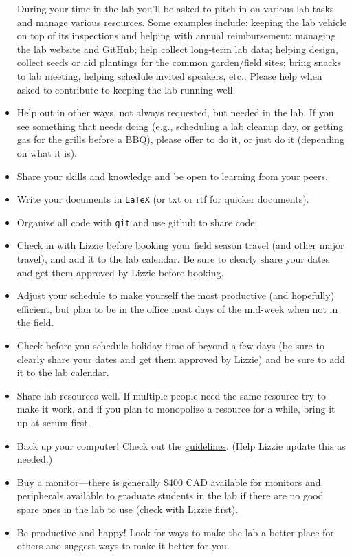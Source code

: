 \documentclass[11pt,a4paper,oneside]{article}
\begin{document}
\begin{itemize}
During your time in the lab you'll be asked to pitch in on various lab tasks and manage various resources. Some examples include: keeping the lab vehicle on top of its inspections and helping with annual reimbursement; managing the lab website and GitHub; help collect long-term lab data; helping design, collect seeds or aid plantings for the common garden/field sites; bring snacks to lab meeting, helping schedule invited speakers, etc.. Please help when asked to contribute to keeping the lab running well. 
\item Help out in other ways, not always requested, but needed in the lab. If you see something that needs doing (e.g., scheduling a lab cleanup day, or getting gas for the grills before a BBQ), please offer to do it, or just do it (depending on what it is). 
\item Share your skills and knowledge and be open to learning from your peers. 
\item Write your documents in \verb|LaTeX| (or txt or rtf for quicker documents).
\item Organize all code with \verb|git| and use github to share code.
\item Check in with Lizzie before booking your field season travel (and other major travel), and add it to the lab calendar. Be sure to clearly share your dates and get them approved by Lizzie before booking. 
\item Adjust your schedule to make yourself the most productive (and hopefully) efficient, but plan to be in the office most days of the mid-week when not in the field.
\item Check before you schedule holiday time of beyond a few days (be sure to clearly share your dates and get them approved by Lizzie) and be sure to add it to the lab calendar.
\item Share lab resources well. If multiple people need the same resource try to make it work, and if you plan to monopolize a resource for a while, bring it up at scrum first. 
\item Back up your computer! Check out the \href{https://github.com/temporalecologylab/labgit/blob/master/datacodemgmt/databackuplab.txt}{guidelines}. (Help Lizzie update this as needed.)
\item Buy a monitor---there is generally \$400 CAD available for monitors and peripherals available to graduate students in the lab if there are no good spare ones in the lab to use (check with Lizzie first). 
\item Be productive and happy! Look for ways to make the lab a better place for others and suggest ways to make it better for you. 
\end{itemize}

% 
\end{document}
